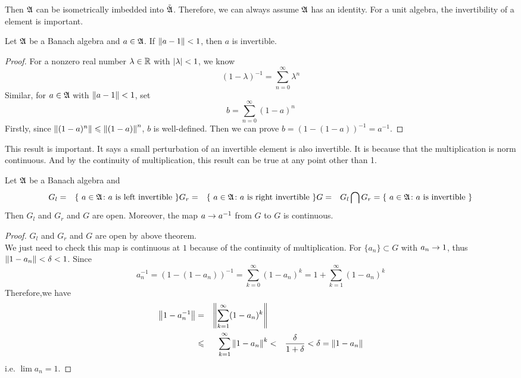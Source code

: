 Then $\mathfrak{A}$ can be isometrically imbedded into $\tilde{\mathfrak{A}}$. Therefore, we can always assume $\mathfrak{A}$ has an identity. For a unit algebra, the invertibility of a element is important. 

\begin{thm}
	Let $\mathfrak{A}$ be a Banach algebra and $a \in \mathfrak{A}$. If $\left\lVert a-1\right\lVert < 1$, then $a$ is invertible.
\end{thm}
\begin{proof}
	For a nonzero real number $\lambda \in \mathbb{R}$ with $\left\lvert\lambda\right\lvert < 1$, we know 
	\begin{equation*}
		(1-\lambda)^{-1} = \sum_{n=0}^{\infty} \lambda^{n}
	\end{equation*}
	Similar, for $a \in \mathfrak{A}$ with $\left\lVert a-1\right\lVert < 1$, set
	\begin{equation*}
		b= \sum_{n=0}^{\infty} (1-a)^{n}
	\end{equation*}
	Firstly, since $\left\lVert(1-a)^{n}\right\lVert \leqslant \left\lVert(1-a)\right\lVert^{n}$, $b$ is well-defined. Then we can prove $b = (1-(1-a))^{-1} = a^{-1}$.
\end{proof}
\begin{rem}
	This result is important. It says a small perturbation of an invertible element is also invertible. It is because that the multiplication is norm continuous. And by the continuity of multiplication, this result can be true at any point other than 1.
\end{rem}

\begin{cor}
	Let $\mathfrak{A}$ be a Banach algebra and 
	\begin{eqnarray*}
		G_l &=& \{~a \in \mathfrak{A} \colon a \text{ is left invertible}~\}
		G_r &=& \{~a \in \mathfrak{A} \colon a \text{ is right invertible}~\}
		G &=& G_l \bigcap G_r = \{~a \in \mathfrak{A} \colon a \text{ is invertible}~\}
	\end{eqnarray*}
	Then $G_l$ and $G_r$ and $G$ are open. Moreover, the map $a \rightarrow a^{-1}$ from $G$ to $G$ is continuous.
\end{cor}
\begin{proof}
	$G_l$ and $G_r$ and $G$ are open by above theorem. \\
	We just need to check this map is continuous at $1$ because of the continuity of multiplication. For $\{a_n\} \subset G$ with $a_n \rightarrow 1$, thus $\left\lVert1-a_n\right\lVert<\delta<1$. Since
	\begin{equation*}
		a_n^{-1} = (1-(1-a_n))^{-1} = \sum_{k=0}^{\infty} (1-a_n)^{k} = 1+ \sum_{k=1}^{\infty} (1-a_n)^{k}
	\end{equation*}
	Therefore,we have
	\begin{eqnarray*}
		\left\lVert1-a_n^{-1}\right\lVert &=& \left\lVert\sum_{k=1}^{\infty} (1-a_n)^{k}\right\lVert\\
		&\leqslant&  \sum_{k=1}^{\infty} \left\lVert1-a_n\right\lVert^{k}
		&<& \frac{\delta}{1+\delta} < \delta = \left\lVert1-a_n\right\lVert
	\end{eqnarray*}
	i.e. $\lim a_n = 1$.
\end{proof}

